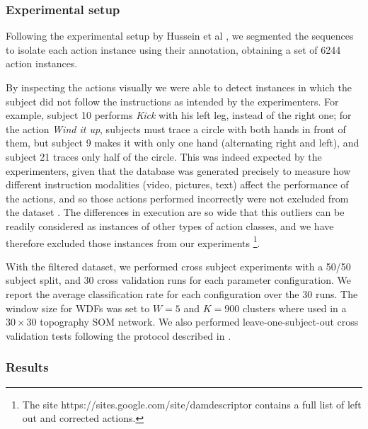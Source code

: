 \documentclass{fcs}
\begin{document}
\subsubsection{Experimental setup}

Following the experimental setup by Hussein et al \cite{hussein2013human}, we segmented the sequences to isolate each action instance using their annotation, obtaining a set of 6244 action instances. 

By inspecting the actions visually we were able to detect instances in which the subject did not follow the instructions as intended by the experimenters. For example, subject 10 performs \textit{Kick} with his left leg, instead of the right one; for the action \textit{Wind it up}, subjects must trace a circle with both hands in front of them, but subject 9 makes it with only one hand (alternating right and left), and subject 21 traces only half of the circle. This was indeed expected by the experimenters, given that the database was generated precisely to measure how different instruction modalities (video, pictures, text) affect the performance of the actions, and so those actions performed incorrectly were not excluded from the dataset \cite{fothergill2012instructing}. The differences in execution are so wide that this outliers can be readily considered as instances of other types of action classes, and we have therefore excluded those instances from our experiments \footnote{The site https://sites.google.com/site/damdescriptor contains a full list of left out and corrected actions.}. 


With the filtered dataset, we performed cross subject experiments with a 50/50 subject split, and 30 cross validation runs for each parameter configuration. We report the average classification rate for each configuration over the 30 runs. The window size for WDFs was set to $W=5$ and $K=900$ clusters where used in a $30 \times 30$ topography SOM network. We also performed leave-one-subject-out cross validation tests following the protocol described in \cite{hussein2013human}.

\subsubsection{Results}
\end{document}
